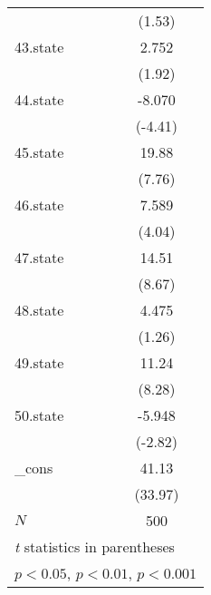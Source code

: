 {\begin{tabular}{l*{1}{c}}
            &      (1.53)         \\
[1em]
43.state    &       2.752         \\
            &      (1.92)         \\
[1em]
44.state    &      -8.070\sym{***}\\
            &     (-4.41)         \\
[1em]
45.state    &       19.88\sym{***}\\
            &      (7.76)         \\
[1em]
46.state    &       7.589\sym{***}\\
            &      (4.04)         \\
[1em]
47.state    &       14.51\sym{***}\\
            &      (8.67)         \\
[1em]
48.state    &       4.475         \\
            &      (1.26)         \\
[1em]
49.state    &       11.24\sym{***}\\
            &      (8.28)         \\
[1em]
50.state    &      -5.948\sym{**} \\
            &     (-2.82)         \\
[1em]
\_cons      &       41.13\sym{***}\\
            &     (33.97)         \\
\hline
\(N\)       &         500         \\
\hline\hline
\multicolumn{2}{l}{\footnotesize \textit{t} statistics in parentheses}\\
\multicolumn{2}{l}{\footnotesize \sym{*} \(p<0.05\), \sym{**} \(p<0.01\), \sym{***} \(p<0.001\)}\\
\end{tabular}
}
